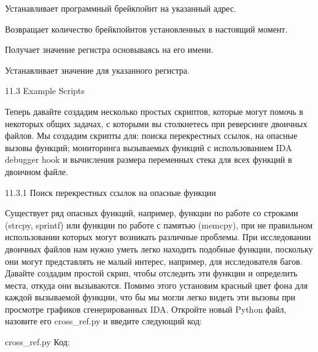 \documentclass[12pt, a4paper, oneside]{book}
\begin{document}
Устанавливает программный брейкпойнт на указанный адрес.

Возвращает количество брейкпойнтов установленных в настоящий момент. 

Получает значение регистра основываясь на его имени.

Устанавливает значение для указанного регистра.


11.3 Example Scripts

Теперь давайте создадим несколько простых скриптов, которые могут помочь в некоторых общих задачах, с которыми вы столкнетесь при реверсинге двоичных файлов. Мы создадим скрипты для: поиска перекрестных ссылок, на опасные вызовы функций; мониторинга вызываемых функций с использованием IDA debugger hook и вычисления размера переменных стека для всех функций в двоичном файле.

11.3.1 Поиск перекрестных ссылок на опасные функции

Существует ряд опасных функций, например, функции по работе со строками (strcpy, sprintf) или функции по работе с памятью (memcpy), при не правильном использовании которых могут возникать различные проблемы. При исследовании двоичных файлов нам нужно уметь легко находить подобные функции, поскольку они могут представлять не малый интерес, например, для исследователя багов. Давайте создадим простой скрип, чтобы отследить эти функции и определить места, откуда они вызываются. Помимо этого установим красный цвет фона для каждой вызываемой функции, что бы мы могли легко видеть эти вызовы при просмотре графиков сгенерированных IDA. Откройте новый Python файл, назовите его cross\_ref.py и введите следующий код:

cross\_ref.py
Код:







            
\end{document}
